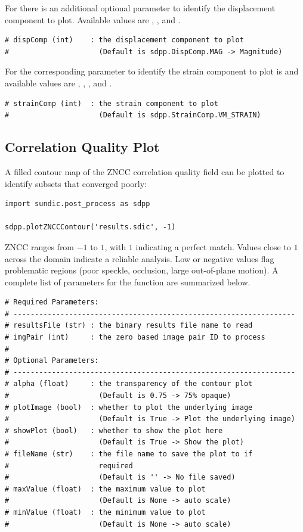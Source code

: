 For  there is an additional optional parameter  to identify the displacement component to plot.  Available  values are , , and .

\begin{lstlisting}
# dispComp (int)    : the displacement component to plot
#                     (Default is sdpp.DispComp.MAG -> Magnitude)
\end{lstlisting}


For  the corresponding parameter to identify the strain component to plot is  and available  values are  , , , and .

\begin{lstlisting}
# strainComp (int)  : the strain component to plot
#                     (Default is sdpp.StrainComp.VM_STRAIN)
\end{lstlisting}


\subsection{Correlation Quality Plot}

A filled contour map of the ZNCC correlation quality field can be plotted to identify
subsets that converged poorly:

\begin{lstlisting}
import sundic.post_process as sdpp

sdpp.plotZNCCContour('results.sdic', -1)
\end{lstlisting}

ZNCC ranges from $-1$ to $1$, with $1$ indicating a perfect match.
Values close to $1$ across the domain indicate a reliable analysis.  Low or negative
values flag problematic regions (poor speckle, occlusion, large out-of-plane motion).  A complete list of parameters for the  function are summarized below.

\begin{lstlisting}
# Required Parameters:
# ------------------------------------------------------------------
# resultsFile (str) : the binary results file name to read
# imgPair (int)     : the zero based image pair ID to process
# 
# Optional Parameters:
# ------------------------------------------------------------------
# alpha (float)     : the transparency of the contour plot
#                     (Default is 0.75 -> 75% opaque)
# plotImage (bool)  : whether to plot the underlying image
#                     (Default is True -> Plot the underlying image)
# showPlot (bool)   : whether to show the plot here
#                     (Default is True -> Show the plot)
# fileName (str)    : the file name to save the plot to if 
#                     required
#                     (Default is '' -> No file saved)
# maxValue (float)  : the maximum value to plot
#                     (Default is None -> auto scale)
# minValue (float)  : the minimum value to plot
#                     (Default is None -> auto scale)
\end{lstlisting}



